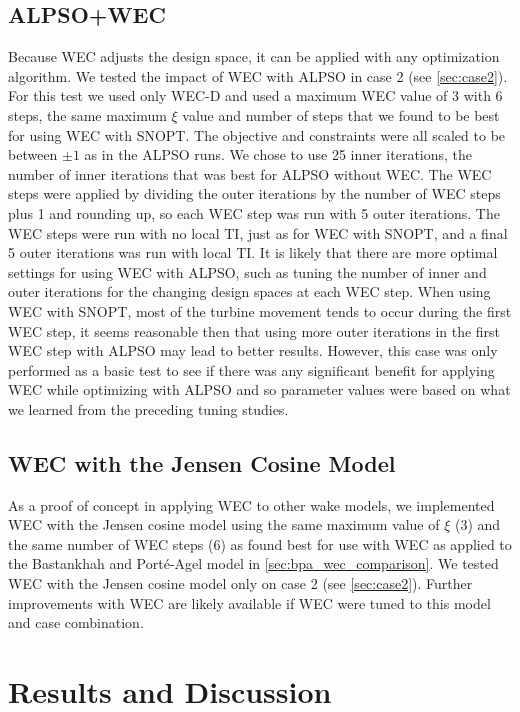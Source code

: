 \documentclass{jpconf}
\begin{document}
\subsection{ALPSO+WEC}
Because WEC adjusts the design space, it can be applied with any optimization algorithm. We tested the impact of WEC with ALPSO in case 2 (see \cref{sec:case2}). For this test we used only WEC-D and used a maximum WEC value of 3 with 6 steps, the same maximum $\xi$ value and number of steps that we found to be best for using WEC with SNOPT. The objective and constraints were all scaled to be between $\pm1$ as in the ALPSO runs. We chose to use 25 inner iterations, the number of inner iterations that was best for ALPSO without WEC. The WEC steps were applied by dividing the outer iterations by the number of WEC steps plus 1 and rounding up, so each WEC step was run with 5 outer iterations. The WEC steps were run with no local TI, just as for WEC with SNOPT, and a final 5 outer iterations was run with local TI. It is likely that there are more optimal settings for using WEC with ALPSO, such as tuning the number of inner and outer iterations for the changing design spaces at each WEC step. When using WEC with SNOPT, most of the turbine movement tends to occur during the first WEC step, it seems reasonable then that using more outer iterations in the first WEC step with ALPSO may lead to better results. However, this case was only performed as a basic test to see if there was any significant benefit for applying WEC while optimizing with ALPSO and so parameter values were based on what we learned from the preceding tuning studies.

\subsection{WEC with the Jensen Cosine Model}
As a proof of concept in applying WEC to other wake models, we implemented WEC with the Jensen cosine model using the same maximum value of $\xi$ (3) and the same number of WEC steps (6) as found best for use with WEC as applied to the Bastankhah and Port\'{e}-Agel model in \cref{sec:bpa_wec_comparison}. We tested WEC with the Jensen cosine model only on case 2 (see \cref{sec:case2}). Further improvements with WEC are likely available if WEC were tuned to this model and case combination.

\section{Results and Discussion}\label{sec:results}
\end{document}
